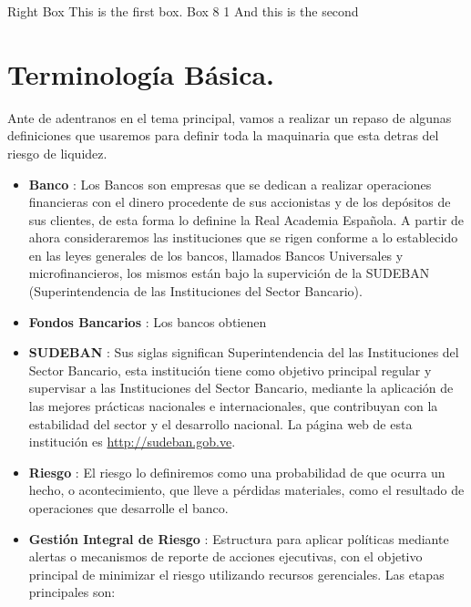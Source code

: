 \documentclass[10pt,]{article}
\begin{document}
Right Box This is the first box. Box 8 1 And this is the second

\hypertarget{terminologia-basica.}{%
\section{Terminología Básica.}\label{terminologia-basica.}}

Ante de adentranos en el tema principal, vamos a realizar un repaso de
algunas definiciones que usaremos para definir toda la maquinaria que
esta detras del riesgo de liquidez.

\begin{itemize}
\item
  \textbf{Banco} : Los Bancos son empresas que se dedican a realizar
  operaciones financieras con el dinero procedente de sus accionistas y
  de los depósitos de sus clientes, de esta forma lo definine la Real
  Academia Española. A partir de ahora consideraremos las instituciones
  que se rigen conforme a lo establecido en las leyes generales de los
  bancos, llamados Bancos Universales y microfinancieros, los mismos
  están bajo la supervición de la SUDEBAN (Superintendencia de las
  Instituciones del Sector Bancario).
\item
  \textbf{Fondos Bancarios} : Los bancos obtienen
\item
  \textbf{SUDEBAN} : Sus siglas significan Superintendencia del las
  Instituciones del Sector Bancario, esta institución tiene como
  objetivo principal regular y supervisar a las Instituciones del Sector
  Bancario, mediante la aplicación de las mejores prácticas nacionales e
  internacionales, que contribuyan con la estabilidad del sector y el
  desarrollo nacional. La página web de esta institución es
  \url{http://sudeban.gob.ve}.
\item
  \textbf{Riesgo} : El riesgo lo definiremos como una probabilidad de
  que ocurra un hecho, o acontecimiento, que lleve a pérdidas
  materiales, como el resultado de operaciones que desarrolle el banco.
\item
  \textbf{Gestión Integral de Riesgo} : Estructura para aplicar
  políticas mediante alertas o mecanismos de reporte de acciones
  ejecutivas, con el objetivo principal de minimizar el riesgo
  utilizando recursos gerenciales. Las etapas principales son:


\end{itemize}
\end{document}
